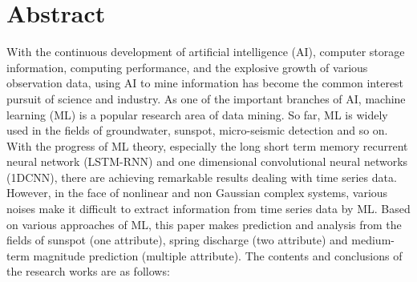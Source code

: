 \intobmk\chapter*{Abstract}
With the continuous development of artificial intelligence (AI), computer storage information, computing performance, and the explosive growth of various observation data, using AI to mine information has become the common interest pursuit of science and industry. As one of the important branches of AI, machine learning (ML) is a popular research area of data mining. So far, ML is widely used in the fields of groundwater, sunspot, micro-seismic detection and so on. With the progress of ML theory, especially the long short term memory recurrent neural network (LSTM-RNN) and one dimensional convolutional neural networks (1DCNN), there are achieving remarkable results dealing with time series data. However, in the face of nonlinear and non Gaussian complex systems, various noises make it difficult to extract information from time series data by ML. Based on various approaches of ML, this paper makes prediction and analysis from the fields of sunspot (one attribute), spring discharge (two attribute) and medium-term magnitude prediction (multiple attribute). The contents and conclusions of the research works are as follows:
